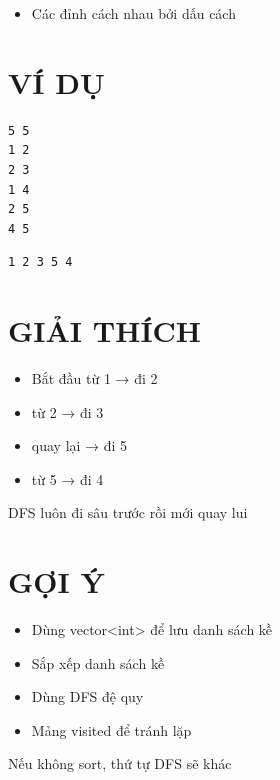 \documentclass[a4paper,12pt]{article}
\begin{document}
\begin{itemize}
\item Các đỉnh cách nhau bởi dấu cách
\end{itemize}

\section*{VÍ DỤ}

\begin{tcolorbox}[title=Input]
\begin{lstlisting}
5 5
1 2
2 3
1 4
2 5
4 5
\end{lstlisting}
\end{tcolorbox}

\begin{tcolorbox}[title=Output]
\begin{lstlisting}
1 2 3 5 4
\end{lstlisting}
\end{tcolorbox}

\section*{GIẢI THÍCH}
\begin{itemize}
\item Bắt đầu từ 1 → đi 2
\item từ 2 → đi 3
\item quay lại → đi 5
\item từ 5 → đi 4
\end{itemize}

\begin{tcolorbox}
DFS luôn đi sâu trước rồi mới quay lui
\end{tcolorbox}

\section*{GỢI Ý}
\begin{itemize}
\item Dùng vector<int> để lưu danh sách kề
\item Sắp xếp danh sách kề
\item Dùng DFS đệ quy
\item Mảng visited để tránh lặp
\end{itemize}

\begin{tcolorbox}
Nếu không sort, thứ tự DFS sẽ khác
\end{tcolorbox}
\end{document}
